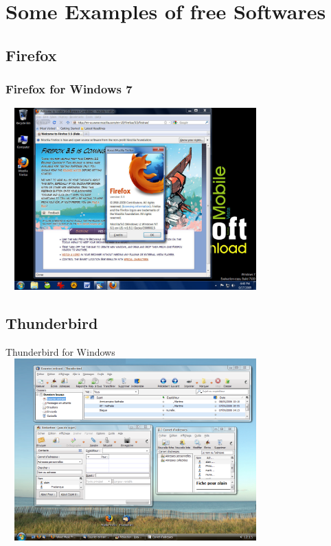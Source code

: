 \documentclass[11pt,hyperref={pdfpagemode=FullScreen}]{beamer}
\begin{document}
\section{Some Examples of free Softwares}
\subsection{Firefox}
\begin{frame}
\frametitle{Firefox for Windows 7}
\begin{center}
 \includegraphics[width=10cm, height=7cm]{./firefox.jpg}
\end{center}
\end{frame}

\subsection{Thunderbird}
\begin{frame}{Thunderbird for Windows}
\includegraphics[width=10cm, height=7cm]{./thunderbird} 
\end{frame}

\end{document}

